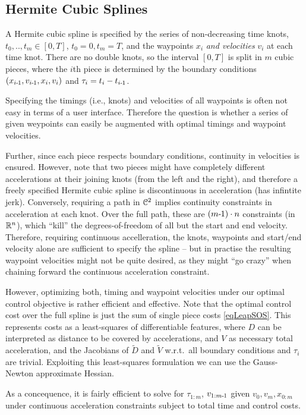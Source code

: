 \subsection{Hermite Cubic Splines}

A Hermite cubic spline is specified by the series of non-decreasing
time knots, $t_0,..,t_m \in [0,T]$, $t_0=0, t_m=T$, and the waypoints
$x_i$ \emph{and velocities} $v_i$ at each time knot. There are no
double knots, so the interval $[0,T]$ is split in $m$ cubic pieces,
where the $i$th piece is determined by the boundary conditions
$(x_{i{{\hspace*{-.0pt}\text{\rm -}\hspace*{-.5pt}}1}},v_{i{{\hspace*{-.0pt}\text{\rm -}\hspace*{-.5pt}}1}}, x_i, v_i)$ and $\tau_i = t_i - t_{i{{\hspace*{-.0pt}\text{\rm -}\hspace*{-.5pt}}1}}$.

Specifying the timings (i.e., knots) and velocities of all waypoints is often not easy in terms of a user interface. Therefore the question is whether a series of given weypoints can easily be augmented with optimal timings and waypoint velocities.

Further, since each piece respects boundary conditions, continuity in velocities is ensured. However, note that two pieces might have completely different
accelerations at their joining knots (from the left and the right), and therefore a freely specified Hermite cubic spline is discontinuous in acceleration (has infintite jerk). Conversely, requiring a path in  ${\cal C}^2$ implies continuity constraints in acceleration at each knot. Over the full path, these are $(m{{\hspace*{-.0pt}\text{\rm -}\hspace*{-.5pt}}1}) \cdot n$ constraints (in ${\mathbb{R}}^n$), which ``kill'' the degrees-of-freedom of all but the start and end velocity. Therefore, requiring continuous accelleration, the knots, waypoints and start/end velocity alone are sufficient to specify the spline -- but in practise the resulting waypoint velocities might not be quite desired, as they might ``go crazy'' when chaining forward the continuous acceleration constraint.

However, optimizing both, timing and waypoint velocities under our
optimal control objective is rather efficient and effective. Note that
the optimal control cost over the full spline is just the sum of
single piece costs \eqref{eqLeapSOS}. This represents costs as a
least-squares of differentiable features, where $D$ can be interpreted
as distance to be covered by accelerations, and $V$ as necessary total
acceleration, and the Jacobians of $\tilde D$ and $\tilde V$
w.r.t.\ all boundary conditions and $\tau_i$ are trivial. Exploiting
this least-squares formulation we can use the Gauss-Newton
approximate Hessian.

As a concequence, it is fairly efficient to solve for $\tau_{1:m}$, $v_{1:m{{\hspace*{-.0pt}\text{\rm -}\hspace*{-.5pt}}1}}$ given $v_0, v_m, x_{0:m}$ under continuous acceleration constraints subject to total time and control costs.

